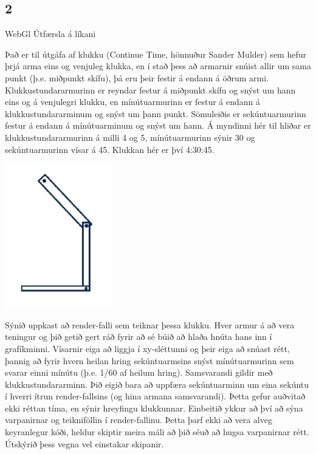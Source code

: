 \documentclass{article}
\begin{document}
\newpage

\subsection{2} WebGl Útfærsla á líkani

Það er til útgáfa af klukku (Continue Time, hönnuður Sander Mulder) sem hefur
þrjá arma eins og venjuleg klukka, en í stað þess að armarnir
snúist allir um sama punkt (þ.e. miðpunkt skífu), þá eru þeir
festir á endann á öðrum armi. Klukkustundararmurinn er
reyndar festur á miðpunkt skífu og snýst um hann eins og á
venjulegri klukku, en mínútuarmurinn er festur á endann á
klukkustundararminum og snýst um þann punkt. Sömuleiðis
er sekúntuarmurinn festur á endann á mínútuarminum og
snýst um hann. Á myndinni hér til hliðar er
klukkustundararmurinn á milli 4 og 5, mínútuarmurinn sýnir
30 og sekúntuarmurinn vísar á 45. Klukkan hér er því
4:30:45.

\includegraphics[scale = 0.9]{myndir/klukka.png}

Sýnið uppkast að render-falli sem teiknar þessa klukku. Hver armur á að vera
teningur og þið getið gert ráð fyrir að sé búið að hlaða hnúta hans inn í
grafíkminni. Vísarnir eiga að liggja í xy-sléttunni og þeir eiga að snúast rétt,
þannig að fyrir hvern heilan hring sekúntuarmsins snýst mínútuarmurinn sem
svarar einni mínútu (þ.e. 1/60 af heilum hring). Samsvarandi gildir með
klukkustundararminn. Þið eigið bara að uppfæra sekúntuarminn um eina sekúntu í
hverri ítrun render-fallsins (og hina armana samsvarandi). Þetta gefur auðvitað
ekki réttan tíma, en sýnir hreyfingu klukkunnar.
Einbeitið ykkur að því að sýna varpanirnar og teikniföllin í render-fallinu. Þetta
þarf ekki að vera alveg keyranlegur kóði, heldur skiptir meira máli að þið séuð að
hugsa varpanirnar rétt. Útskýrið þess vegna vel einstakar skipanir.
\end{document}
